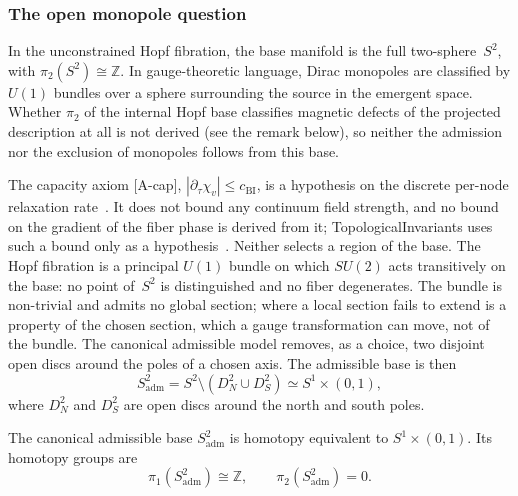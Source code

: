   \subsubsection*{The open monopole question}
    \label{sec:no-monopoles}

    In the unconstrained Hopf fibration, the base manifold is the full two-sphere~$S^2$,
    with $\pi_2(S^2) \cong \mathbb{Z}$.
    In gauge-theoretic language, Dirac monopoles are classified by $U(1)$ bundles over a sphere
    surrounding the source in the emergent space.
    Whether $\pi_2$ of the internal Hopf base classifies magnetic defects of the projected description
    at all is not derived (see the remark below), so neither the admission nor the exclusion of
    monopoles follows from this base.

    The capacity axiom [A-cap], $|\partial_\tau \chi_v| \le c_{\mathrm{BI}}$, is a hypothesis on the
    discrete per-node relaxation rate~\cite{Beau2026c}.
    It does not bound any continuum field strength, and no bound on the gradient of the fiber phase
    is derived from it; TopologicalInvariants uses such a bound only as a hypothesis~\cite{Beau2026k}.
    Neither selects a region of the base.
    The Hopf fibration is a principal $U(1)$ bundle on which $SU(2)$ acts transitively on the
    base: no point of~$S^2$ is distinguished and no fiber degenerates.
    The bundle is non-trivial and admits no global section; where a local section fails to extend is a
    property of the chosen section, which a gauge transformation can move, not of the bundle.
    The canonical admissible model removes, as a choice, two disjoint open discs around the poles
    of a chosen axis.
    The admissible base is then
    \begin{equation}
      S^2_{\mathrm{adm}} = S^2 \setminus (D^2_N \cup D^2_S) \simeq S^1 \times (0,1),
    \end{equation}
    where $D^2_N$ and $D^2_S$ are open discs around the north and south poles.

    \begin{proposition}
      \label{prop:pi2-trivial}
      The canonical admissible base $S^2_{\mathrm{adm}}$ is homotopy equivalent
      to $S^1 \times (0,1)$.
      Its homotopy groups are
      \begin{equation}
        \pi_1(S^2_{\mathrm{adm}}) \cong \mathbb{Z}, \qquad \pi_2(S^2_{\mathrm{adm}}) = 0.
      \end{equation}
    \end{proposition}

